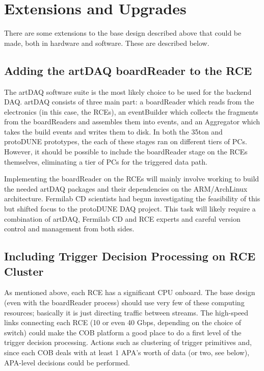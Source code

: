




\section{Extensions and Upgrades}
\label{sec:upgrades}

There are some extensions to the base design described above that could be made, both in hardware and software.  These are described below. 

\subsection{Adding the artDAQ boardReader to the RCE}
\label{sec:board reader}
The artDAQ software suite is the most likely choice to be used for the backend DAQ.  artDAQ consists of three main part:  a boardReader which reads from the electronics (in this case, the RCEs), an eventBuilder which collects the fragments from the boardReaders and assembles them into events, and an Aggregator which takes the build events and writes them to disk.  In both the 35ton and protoDUNE prototypes, the each of these stages ran on different tiers of PCs.  However, it should be possible to include the boardReader stage on the RCEs themselves, eliminating a tier of PCs for the triggered data path. 

Implementing the boardReader on the RCEs will mainly involve working to build the needed artDAQ packages and their dependencies on the ARM/ArchLinux architecture.  Fermilab CD scientists had begun investigating the feasibility of this but shifted focus to the protoDUNE DAQ project.  This task will likely require a combination of artDAQ, Fermilab CD and  RCE experts and careful version control and management from both sides.  

\subsection{Including Trigger Decision Processing on RCE Cluster}
\label{sec:triggerOnRCE}
 As mentioned above,  each RCE has a significant CPU onboard. The base design (even with the boardReader process) should use very few of these computing resources; basically it is just directing traffic between streams.  The high-speed links connecting each RCE (10 or even 40 Gbps, depending on the choice of switch) could make the COB platform a good place to do a first level of the trigger decision processing.  Actions such as clustering of trigger primitives and, since  each COB deals with at least 1 APA's worth of data (or two, see below), APA-level decisions could be performed.  
 
